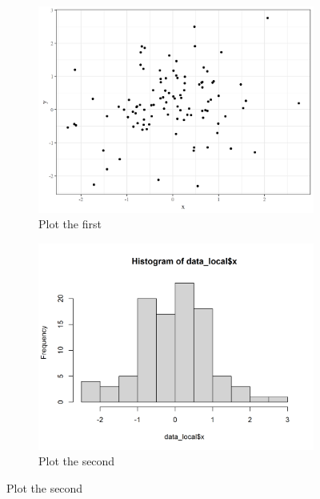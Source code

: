 \documentclass[
]{article}
\begin{document}
\begin{figure}[h]
\begin{multicols}{2}
\begin{figure}[H]
\includegraphics[width = \linewidth]{mandatory_chunk_name-1.png}
\caption{Plot the first}
\label{fig:plotmeans}
\end{figure}

\columnbreak

\begin{figure}[H]
\includegraphics[width = \linewidth]{mandatory_chunk_name-2.png}
\centering
\caption{Plot the second}
\label{fig:histogram}
\end{figure}
\end{multicols}
\end{figure}
\end{document}
